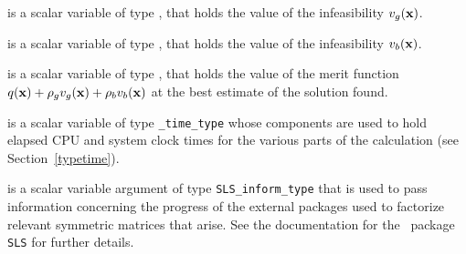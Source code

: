 \begin{description}
 is a scalar variable of type \realdp, that holds the
value of the infeasibility $v_g({\mathbf{x}})$.

 is a scalar variable of type \realdp, that holds the
value of the infeasibility $v_b({\mathbf{x}})$.

 is a scalar variable of type \realdp, that holds the
value of the merit function $q({\mathbf{x}}) + \rho_g v_g({\mathbf{x}}) + \rho_b v_b({\mathbf{x}})$ 
at the best estimate of the solution found.

 is a scalar variable of type {\tt \packagename\_time\_type} 
whose components are used to hold elapsed CPU  and system clock 
times for the various parts of the calculation (see Section~\ref{typetime}).

 is a scalar variable argument of type 
{\tt SLS\_inform\_type} that is used to pass information
concerning the progress of the external packages used to 
factorize relevant symmetric matrices that arise. 
See the documentation for the \galahad\ package {\tt SLS} for further details. 

\end{description}
